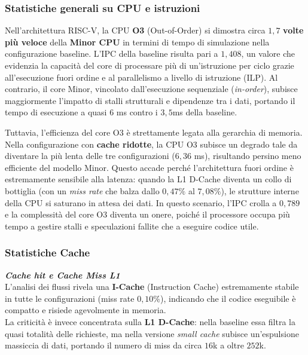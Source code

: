 \documentclass[../../main_document/main.tex]{subfiles}
\begin{document}
\subsubsection{Statistiche generali su CPU e istruzioni}

Nell'architettura RISC-V, la CPU \textbf{O3} (Out-of-Order) si dimostra circa $1,7$ \textbf{volte più veloce} della \textbf{Minor CPU} in termini di tempo di simulazione nella configurazione baseline. L'IPC della baseline risulta pari a $1,408$, un valore che evidenzia la capacità del core di processare più di un'istruzione per ciclo grazie all'esecuzione fuori ordine e al parallelismo a livello di istruzione (ILP). Al contrario, il core Minor, vincolato dall'esecuzione sequenziale (\textit{in-order}), subisce maggiormente l'impatto di stalli strutturali e dipendenze tra i dati, portando il tempo di esecuzione a quasi $6$ ms contro i $3,5$ms della baseline.

\vspace{8pt} 
\noindent 
Tuttavia, l'efficienza del core O3 è strettamente legata alla gerarchia di memoria. Nella configurazione con \textbf{cache ridotte}, la CPU O3 subisce un degrado tale da diventare la più lenta delle tre configurazioni ($6,36$ ms), risultando persino meno efficiente del modello Minor. Questo accade perché l'architettura fuori ordine è estremamente sensibile alla latenza: quando la L1 D-Cache diventa un collo di bottiglia (con un \textit{miss rate} che balza dallo $0,47\%$ al $7,08\%$), le strutture interne della CPU si saturano in attesa dei dati. In questo scenario, l'IPC crolla a $0,789$ e la complessità del core O3 diventa un onere, poiché il processore occupa più tempo a gestire stalli e speculazioni fallite che a eseguire codice utile. 

\subsubsection{Statistiche Cache}

\textbf{\textit{Cache hit e Cache Miss L1}}\\
L'analisi dei flussi rivela una \textbf{I-Cache} (Instruction Cache) estremamente stabile in tutte le configurazioni (miss rate $0,10\%$), indicando che il codice eseguibile è compatto e risiede agevolmente in memoria.\\
La criticità è invece concentrata sulla \textbf{L1 D-Cache}: nella baseline essa filtra la quasi totalità delle richieste, ma nella versione \textit{small cache} subisce un'espulsione massiccia di dati, portando il numero di miss da circa $16$k a oltre $252$k.
\end{document}

